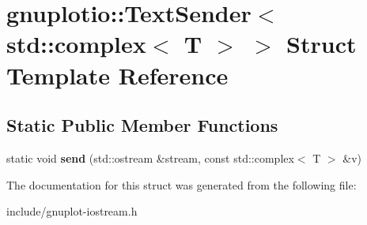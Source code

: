 \hypertarget{structgnuplotio_1_1TextSender_3_01std_1_1complex_3_01T_01_4_01_4}{}\section{gnuplotio\+:\+:Text\+Sender$<$ std\+:\+:complex$<$ T $>$ $>$ Struct Template Reference}
\label{structgnuplotio_1_1TextSender_3_01std_1_1complex_3_01T_01_4_01_4}
\subsection*{Static Public Member Functions}
\begin{DoxyCompactItemize}
\item 
\mbox{\label{structgnuplotio_1_1TextSender_3_01std_1_1complex_3_01T_01_4_01_4_ad524aa3e121d0ebd66346d77f1fd5a1c}} 
static void {\bfseries send} (std\+::ostream \&stream, const std\+::complex$<$ T $>$ \&v)
\end{DoxyCompactItemize}


The documentation for this struct was generated from the following file\+:\begin{DoxyCompactItemize}
\item 
include/gnuplot-\/iostream.\+h\end{DoxyCompactItemize}
